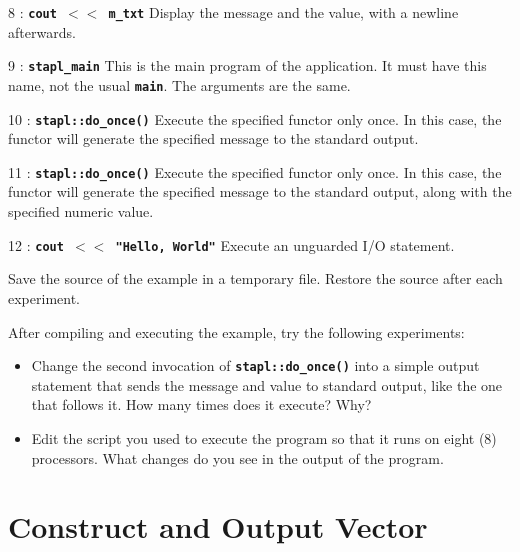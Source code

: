\documentclass{report}
\begin{document}
\begin{hashitemize}
\item 8 : \texttt{{\bf cout $<<$ m\_txt}}
\newline
Display the message and the value, with a newline afterwards.

\item 9 : \texttt{{\bf stapl\_main}}
\newline
This is the main program of the application.  It must have this name,
not the usual
\texttt{{\bf main}}.
The arguments are the same.

\item 10 : \texttt{{\bf stapl::do\_once()}}
\newline
Execute the specified functor only once.  In this case, the functor will
generate the specified message to the standard output.

\item 11 : \texttt{{\bf stapl::do\_once()}}
\newline
Execute the specified functor only once.  In this case, the functor will
generate the specified message to the standard output, along with the
specified numeric value.

\item 12 : \texttt{{\bf cout $<<$ "Hello, World"}}
\newline
Execute an unguarded I/O statement.

\end{hashitemize}

Save the source of the example in a temporary file.
Restore the source after each experiment.

After compiling and executing the example, try the following experiments:
\begin{itemize}
\item
Change the second invocation of
\texttt{{\bf stapl::do\_once()}}
into a simple output statement that sends the message and value to
standard output, like the one that follows it.
How many times does it execute?  Why?
\item
Edit the script you used to execute the program so that it runs on
eight (8) processors.  What changes do you see in the output of the
program.
\end{itemize}


\pagebreak
\section{Construct and Output Vector}
\end{document}
